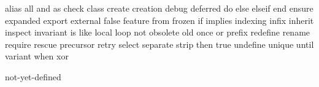 \useprettyidentifiers \EIFidentifiers \EIFsetspecials
  alias all and as check class create creation debug deferred do else
  elseif end ensure expanded export external false feature from frozen
  if implies indexing infix inherit inspect invariant is like local
  loop not obsolete old once or prefix redefine rename require rescue
  precursor retry select separate strip then true undefine unique
  until variant when xor

\useprettyidentifiers \EIFvariables \EIFsetspecials
  not-yet-defined

\protect \endinput  
